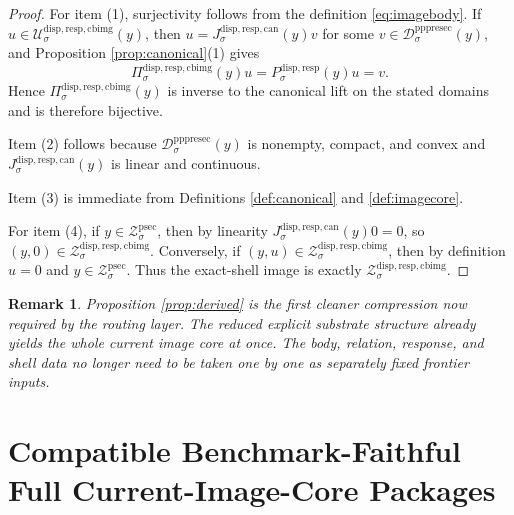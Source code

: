 \documentclass[11pt]{article}
\newcommand{\ProtoSectionShell}[1]{\mathcal Z_{#1}^{\mathrm{psec}}}
\newcommand{\PrePreProtoSectionResidualBody}[1]{\mathcal D_{#1}^{\mathrm{pppresec}}}
\newcommand{\SubstrateProjection}[1]{P_{#1}^{\mathrm{disp,resp}}}
\newcommand{\CanonicalLift}[1]{J_{#1}^{\mathrm{disp,resp,can}}}
\newcommand{\CanonicalImageBody}[1]{\mathcal U_{#1}^{\mathrm{disp,resp,cbimg}}}
\newcommand{\ImageProjection}[1]{\Pi_{#1}^{\mathrm{disp,resp,cbimg}}}
\newcommand{\CanonicalImageShell}[1]{\mathcal Z_{#1}^{\mathrm{disp,resp,cbimg}}}
\newtheorem{remark}{Remark}
\begin{document}
\begin{proof}
For item (1), surjectivity follows from the definition \eqref{eq:imagebody}. If \(u\in\CanonicalImageBody{\sigma}(y)\), then \(u=\CanonicalLift{\sigma}(y)v\) for some \(v\in\PrePreProtoSectionResidualBody{\sigma}(y)\), and Proposition \ref{prop:canonical}(1) gives
\[
\ImageProjection{\sigma}(y)u
=
\SubstrateProjection{\sigma}(y)u
=
v.
\]
Hence \(\ImageProjection{\sigma}(y)\) is inverse to the canonical lift on the stated domains and is therefore bijective.

Item (2) follows because \(\PrePreProtoSectionResidualBody{\sigma}(y)\) is nonempty, compact, and convex and \(\CanonicalLift{\sigma}(y)\) is linear and continuous.

Item (3) is immediate from Definitions \ref{def:canonical} and \ref{def:imagecore}.

For item (4), if \(y\in\ProtoSectionShell{\sigma}\), then by linearity \(\CanonicalLift{\sigma}(y)0=0\), so \((y,0)\in\CanonicalImageShell{\sigma}\). Conversely, if \((y,u)\in\CanonicalImageShell{\sigma}\), then by definition \(u=0\) and \(y\in\ProtoSectionShell{\sigma}\). Thus the exact-shell image is exactly \(\CanonicalImageShell{\sigma}\).
\end{proof}

\begin{remark}
Proposition \ref{prop:derived} is the first cleaner compression now required by the routing layer. The reduced explicit substrate structure already yields the whole current image core at once. The body, relation, response, and shell data no longer need to be taken one by one as separately fixed frontier inputs.
\end{remark}

\section{Compatible Benchmark-Faithful Full Current-Image-Core Packages}
\end{document}
